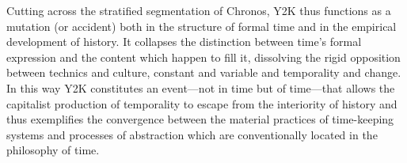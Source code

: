 Cutting across the stratified segmentation of Chronos, Y2K thus functions as a mutation (or accident) both in the structure of formal time and in the empirical development of history. It collapses the distinction between time's formal expression and the content which happen to fill it, dissolving the rigid opposition between technics and culture, constant and variable and temporality and change. In this way Y2K constitutes an event---not in time but of time---that allows the capitalist production of temporality to escape from the interiority of history and thus exemplifies the convergence between the material practices of time-keeping systems and processes of abstraction which are conventionally located in the philosophy of time.